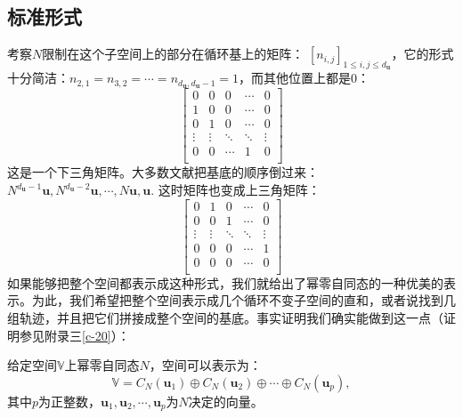 \documentclass[12pt,UTF8,fontset=none]{ctexbook}
\begin{document}
\subsection{标准形式}
考察$N$限制在这个子空间上的部分在循环基上的矩阵：
$[n_{i,j}]_{1 \leqslant i, j \leqslant d_\mathbf{u}}$，它的形式十分简洁：$n_{2,1} = n_{3,2} = \cdots = n_{d_\mathbf{u}, d_\mathbf{u}-1} = 1$，而其他位置上都是0：
$$ \begin{bmatrix}
     0 & 0 & 0 & \cdots & 0 \\
     1 & 0 & 0 & \cdots & 0 \\
     0 & 1 & 0 & \cdots & 0  \\
     \vdots & \vdots & \ddots & \ddots & \vdots  \\
     0 & 0 & \cdots & 1 & 0 \\
    \end{bmatrix} $$
这是一个下三角矩阵。大多数文献把基底的顺序倒过来：$N^{d_\mathbf{u} - 1} \mathbf{u}, N^{d_\mathbf{u} - 2}\mathbf{u}, \cdots , N \mathbf{u}, \mathbf{u}$. 这时矩阵也变成上三角矩阵：
$$ \begin{bmatrix}
     0 & 1 & 0 & \cdots & 0 \\
     0 & 0 & 1 & \cdots & 0 \\
     \vdots & \vdots & \ddots & \ddots & \vdots  \\
     0 & 0 & 0 & \cdots & 1  \\
     0 & 0 & 0 & \cdots & 0 \\
    \end{bmatrix} $$
如果能够把整个空间都表示成这种形式，我们就给出了幂零自同态的一种优美的表示。为此，我们希望把整个空间表示成几个循环不变子空间的直和，或者说找到几组轨迹，并且把它们拼接成整个空间的基底。事实证明我们确实能做到这一点（证明参见附录三\ref{c-20}）：
\begin{pp}\label{pp:6_12_4}
    给定空间$\mathbb{V}$上幂零自同态$N$，空间可以表示为：
    $$ \mathbb{V} = C_N(\mathbf{u}_1) \oplus C_N(\mathbf{u}_2) \oplus \cdots \oplus C_N(\mathbf{u}_p),$$
    其中$p$为正整数，$\mathbf{u}_1, \mathbf{u}_2, \cdots , \mathbf{u}_p$为$N$决定的向量。
\end{pp}
\end{document}
